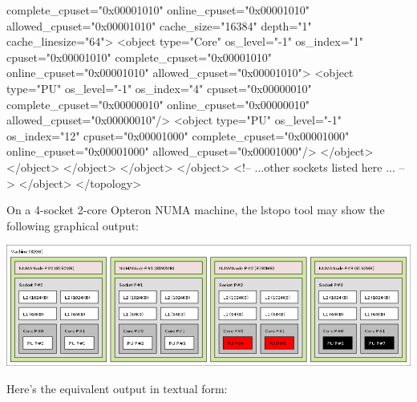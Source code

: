 \begin{DoxyVerb}
              complete_cpuset="0x00001010" online_cpuset="0x00001010" 
              allowed_cpuset="0x00001010" cache_size="16384" depth="1" 
              cache_linesize="64">
            <object type="Core" os_level="-1" os_index="1" cpuset="0x00001010" 
                complete_cpuset="0x00001010" online_cpuset="0x00001010" 
                allowed_cpuset="0x00001010">
              <object type="PU" os_level="-1" os_index="4" cpuset="0x00000010" 
                  complete_cpuset="0x00000010" online_cpuset="0x00000010" 
                  allowed_cpuset="0x00000010"/>
              <object type="PU" os_level="-1" os_index="12" cpuset="0x00001000" 
                  complete_cpuset="0x00001000" online_cpuset="0x00001000" 
                  allowed_cpuset="0x00001000"/>
            </object>
          </object>
        </object>
      </object>
    </object>
    <!-- ...other sockets listed here ... -->
  </object>
</topology>
\end{DoxyVerb}


On a 4-\/socket 2-\/core Opteron NUMA machine, the {\ttfamily lstopo} tool may show the following graphical output:

 
\begin{DoxyImageNoCaption}
  \mbox{\includegraphics[width=\textwidth]{hagrid.png}}
\end{DoxyImageNoCaption}


Here's the equivalent output in textual form:



